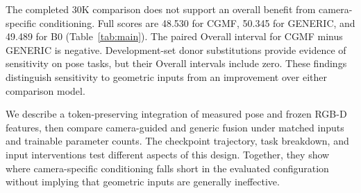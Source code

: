 The completed 30K comparison does not support an overall benefit from camera-specific conditioning. Full scores are 48.530 for CGMF, 50.345 for GENERIC, and 49.489 for B0 (Table~\ref{tab:main}). The paired Overall interval for CGMF minus GENERIC is negative. Development-set donor substitutions provide evidence of sensitivity on pose tasks, but their Overall intervals include zero. These findings distinguish sensitivity to geometric inputs from an improvement over either comparison model.

We describe a token-preserving integration of measured pose and frozen RGB-D features, then compare camera-guided and generic fusion under matched inputs and trainable parameter counts. The checkpoint trajectory, task breakdown, and input interventions test different aspects of this design. Together, they show where camera-specific conditioning falls short in the evaluated configuration without implying that geometric inputs are generally ineffective.
